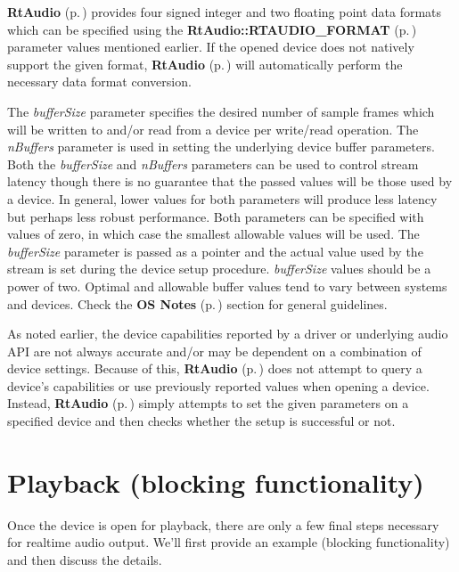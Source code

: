 {\bf Rt\-Audio} {\rm (p.\,\pageref{classRtAudio})} provides four signed integer and two floating point data formats which can be specified using the {\bf Rt\-Audio::RTAUDIO\_\-FORMAT} {\rm (p.\,\pageref{classRtAudio_s0})} parameter values mentioned earlier. If the opened device does not natively support the given format, {\bf Rt\-Audio} {\rm (p.\,\pageref{classRtAudio})} will automatically perform the necessary data format conversion.

The {\em buffer\-Size} parameter specifies the desired number of sample frames which will be written to and/or read from a device per write/read operation. The {\em n\-Buffers} parameter is used in setting the underlying device buffer parameters. Both the {\em buffer\-Size} and {\em n\-Buffers} parameters can be used to control stream latency though there is no guarantee that the passed values will be those used by a device. In general, lower values for both parameters will produce less latency but perhaps less robust performance. Both parameters can be specified with values of zero, in which case the smallest allowable values will be used. The {\em buffer\-Size} parameter is passed as a pointer and the actual value used by the stream is set during the device setup procedure. {\em buffer\-Size} values should be a power of two. Optimal and allowable buffer values tend to vary between systems and devices. Check the {\bf OS Notes} {\rm (p.\,\pageref{osnotes})} section for general guidelines.

As noted earlier, the device capabilities reported by a driver or underlying audio API are not always accurate and/or may be dependent on a combination of device settings. Because of this, {\bf Rt\-Audio} {\rm (p.\,\pageref{classRtAudio})} does not attempt to query a device's capabilities or use previously reported values when opening a device. Instead, {\bf Rt\-Audio} {\rm (p.\,\pageref{classRtAudio})} simply attempts to set the given parameters on a specified device and then checks whether the setup is successful or not.

\section{Playback (blocking functionality)}\label{playbackb}


Once the device is open for playback, there are only a few final steps necessary for realtime audio output. We'll first provide an example (blocking functionality) and then discuss the details.

